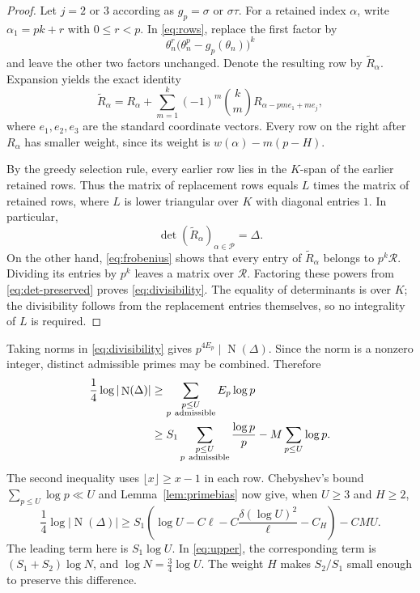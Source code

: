 \documentclass[11pt,a4paper]{amsart}
\theoremstyle{remark}
\newcommand{\cR}{\mathcal R}
\newcommand{\cP}{\mathcal P}
\DeclareMathOperator{\Nm}{N}
\numberwithin{equation}{section}
\begin{document}
\begin{proof}
Let $j=2$ or $3$ according as $g_p=\sigma$ or $\sigma\tau$.
For a retained index $\alpha$, write $\alpha_1=pk+r$ with
$0\le r<p$. In \eqref{eq:rows}, replace the first factor by
\[
 \theta_n^r\bigl(\theta_n^p-g_p(\theta_n)\bigr)^k
\]
and leave the other two factors unchanged. Denote the resulting row
by $\widetilde R_\alpha$. Expansion yields the exact identity
\begin{equation}\label{eq:replacement}
 \widetilde R_\alpha
 =R_\alpha+\sum_{m=1}^k(-1)^m\binom{k}{m}
                       R_{\alpha-pm e_1+me_j},
\end{equation}
where $e_1,e_2,e_3$ are the standard coordinate vectors.
Every row on the right after $R_\alpha$ has smaller weight, since
its weight is $w(\alpha)-m(p-H)$.

By the greedy selection rule, every earlier row lies in the
$K$-span of the earlier retained rows. Thus the matrix of replacement
rows equals $L$ times the matrix of retained rows, where $L$ is lower
triangular over $K$ with diagonal entries $1$. In particular,
\begin{equation}\label{eq:det-preserved}
 \det(\widetilde R_\alpha)_{\alpha\in\cP}=\Delta.
\end{equation}
On the other hand, \eqref{eq:frobenius} shows that every entry of
$\widetilde R_\alpha$ belongs to $p^k\cR$. Dividing its entries
by $p^k$ leaves a matrix over $\cR$. Factoring these powers from
\eqref{eq:det-preserved} proves \eqref{eq:divisibility}.
The equality of determinants is over $K$; the divisibility follows
from the replacement entries themselves, so no integrality of $L$
is required.
\end{proof}

Taking norms in \eqref{eq:divisibility} gives
$p^{4E_p}\mid\Nm(\Delta)$. Since the norm is a nonzero integer,
distinct admissible primes may be combined. Therefore
\begin{align}
 \frac14\log|\Nm(\Delta)|
 &\ge\sum_{\substack{p\le U\\p\ \mathrm{admissible}}}E_p\log p\notag\\
 &\ge S_1\sum_{\substack{p\le U\\p\ \mathrm{admissible}}}
                          \frac{\log p}{p}
       -M\sum_{p\le U}\log p.\label{eq:lower-primes}
\end{align}
The second inequality uses $\lfloor x\rfloor\ge x-1$ in each row.
Chebyshev's bound $\sum_{p\le U}\log p\ll U$ and
Lemma~\ref{lem:primebias} now give, when $U\ge3$ and $H\ge2$,
\begin{equation}\label{eq:lower}
 \frac14\log|\Nm(\Delta)|
 \ge S_1\left(\log U-C\ell
       -C\frac{\delta(\log U)^2}{\ell}-C_H\right)-CMU.
\end{equation}
The leading term here is $S_1\log U$. In \eqref{eq:upper}, the
corresponding term is $(S_1+S_2)\log N$, and
$\log N=\tfrac34\log U$. The weight $H$ makes $S_2/S_1$ small
enough to preserve this difference.
\end{document}
